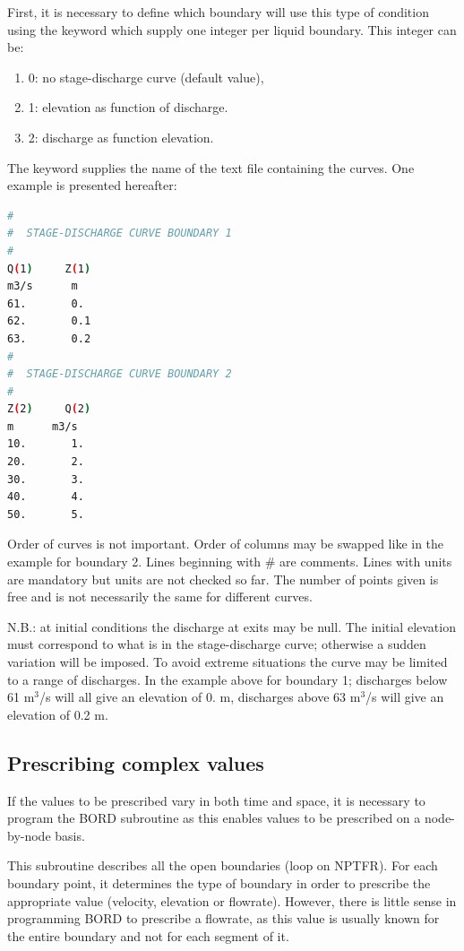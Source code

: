  First, it is necessary to define which boundary will use this type of condition using the keyword  which supply one integer per liquid boundary. This integer can be:

\begin{enumerate}
\item [\nonumber] 0: no stage-discharge curve (default value),

\item [\nonumber] 1: elevation as function of discharge.

\item [\nonumber] 2: discharge as function elevation.
\end{enumerate}

 The keyword  supplies the name of the text file containing the curves. One example is presented hereafter:
\begin{lstlisting}[language=bash]
#
#  STAGE-DISCHARGE CURVE BOUNDARY 1
#
Q(1)     Z(1)
m3/s      m
61.       0.
62.       0.1
63.       0.2
#
#  STAGE-DISCHARGE CURVE BOUNDARY 2
#
Z(2)     Q(2)
m      m3/s
10.       1.
20.       2.
30.       3.
40.       4.
50.       5.
\end{lstlisting}
Order of curves is not important. Order of columns may be swapped like in the example for boundary 2. Lines beginning with \# are comments. Lines with units are mandatory but units are not checked so far. The number of points given is free and is not necessarily the same for different curves.

 N.B.: at initial conditions the discharge at exits may be null. The initial elevation must correspond to what is in the stage-discharge curve; otherwise a sudden variation will be imposed. To avoid extreme situations the curve may be limited to a range of discharges. In the example above for boundary 1; discharges below 61 m${}^{3}$/s will all give an elevation of 0. m, discharges above 63 m${}^{3}$/s will give an elevation of 0.2 m.


\subsection{ Prescribing complex values}
\label{subs:pres:compl:val}
 If the values to be prescribed vary in both time and space, it is necessary to program the BORD subroutine as this enables values to be prescribed on a node-by-node basis.

 This subroutine describes all the open boundaries (loop on NPTFR). For each boundary point, it determines the type of boundary in order to prescribe the appropriate value (velocity, elevation or flowrate). However, there is little sense in programming BORD to prescribe a flowrate, as this value is usually known for the entire boundary and not for each segment of it.

